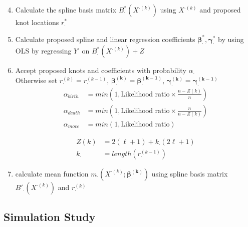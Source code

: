\documentclass[handout]{beamer}\usepackage[]{graphicx}\usepackage[]{color}
\begin{document}
\begin{frame}

\begin{enumerate}
\setcounter{enumi}{3}
\item
Calculate the spline basis matrix $B^*_{\cdot}(X^{\cdot(k)})$ using $X^{\cdot(k)}$ and proposed knot locations $r_{\cdot}^{*}$

\item
Calculate proposed spline and linear regression coefficients $\boldsymbol{\beta^*_{\cdot}},\boldsymbol{\gamma^*_{\cdot}}$ by using OLS by regressing $Y^{\cdot}$ on $B^*_{\cdot}(X^{\cdot(k)}) + Z$

\item
Accept proposed knots and coefficients with probability $\alpha_{\cdot}$ \\

Otherwise set $r_{\cdot}^{(k)}=r_{\cdot}^{(k-1)}$, $\boldsymbol{\beta^{(k)}_{\cdot}} =\boldsymbol{\beta^{(k-1)}_{\cdot}}$, $\boldsymbol{\gamma^{(k)}_{\cdot}} =\boldsymbol{\gamma^{(k-1)}_{\cdot}}$\\

\begin{align*}
\alpha_{birth} &= min\left(1, \text{Likelihood ratio}\times \frac{n-Z(k)}{n} \right) \\
\alpha_{death} &= min\left(1, \text{Likelihood ratio}\times \frac{n}{n-Z(k)} \right) \\
\alpha_{move} &= min\left(1, \text{Likelihood ratio}\right) 
\end{align*}

\begin{align*}
Z(k) &= 2(\ell+1) + k_{\cdot}(2\ell+1) \\
k_{\cdot} &= length(r_{\cdot}^{(k-1)}) 
\end{align*}

\item
calculate mean function $m_{\cdot}(X^{\cdot(k)};\boldsymbol{\beta^{(k)}_{\cdot}})$ using spline basis matrix $B'_{\cdot}(X^{\cdot(k)})$ and $r_{\cdot}^{(k)}$


\end{enumerate}

\end{frame}

\subsection{Simulation Study}
\end{document}
